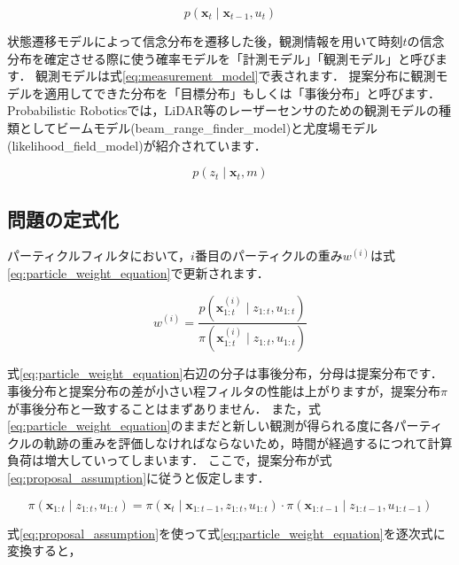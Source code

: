 \documentclass[{../../master}]{subfiles}
\begin{document}
\begin{equation}
  p(\bm{x}_{t} \mid \bm{x}_{t-1}, u_{t})
  \label{eq:motion_model}
\end{equation}

状態遷移モデルによって信念分布を遷移した後，観測情報を用いて時刻$t$の信念分布を確定させる際に使う確率モデルを「計測モデル」\cite{thrun2005probabilistic}「観測モデル」\cite{上田2019}と呼びます．
観測モデルは式\ref{eq:measurement_model}で表されます．
提案分布に観測モデルを適用してできた分布を「目標分布」もしくは「事後分布」と呼びます．
Probabilistic Roboticsでは，LiDAR等のレーザーセンサのための観測モデルの種類としてビームモデル(\textsf{beam\_range\_finder\_model})と尤度場モデル(\textsf{likelihood\_field\_model})が紹介されています．

\begin{equation}
  p(z_{t} \mid \bm{x}_{t}, m)
  \label{eq:measurement_model}
\end{equation}

\subsection{問題の定式化}

パーティクルフィルタにおいて，$i$番目のパーティクルの重み$w^{(i)}$は式\ref{eq:particle_weight_equation}で更新されます．

\begin{equation}
  w^{(i)} = \frac{p(\bm{x}_{1:t}^{(i)} \mid z_{1:t}, u_{1:t})}{\pi(\bm{x}_{1:t}^{(i)} \mid z_{1:t}, u_{1:t})}
  \label{eq:particle_weight_equation}
\end{equation}

式\ref{eq:particle_weight_equation}右辺の分子は事後分布，分母は提案分布です．
事後分布と提案分布の差が小さい程フィルタの性能は上がりますが，提案分布$\pi$が事後分布と一致することはまずありません．
また，式\ref{eq:particle_weight_equation}のままだと新しい観測が得られる度に各パーティクルの軌跡の重みを評価しなければならないため，時間が経過するにつれて計算負荷は増大していってしまいます．
ここで，提案分布が式\ref{eq:proposal_assumption}に従うと仮定します．

\begin{equation}
  \pi(\bm{x}_{1:t} \mid z_{1:t}, u_{1:t}) = \pi(\bm{x}_{t} \mid \bm{x}_{1:t-1}, z_{1:t}, u_{1:t}) \cdot \pi(\bm{x}_{1:t-1} \mid z_{1:t-1}, u_{1:t-1})
  \label{eq:proposal_assumption}
\end{equation}

式\ref{eq:proposal_assumption}を使って式\ref{eq:particle_weight_equation}を逐次式に変換すると，
\end{document}
